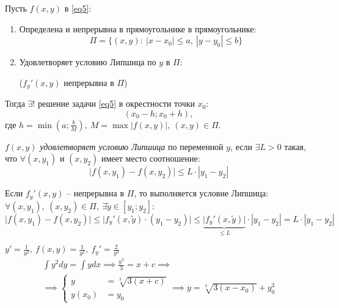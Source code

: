 \begin{theorem}
    Пусть $f(x,y)$ в \ref{eq5}:
    \begin{enumerate}
        \item Определена и непрерывна в прямоугольнике в прямоугольнике:
              \[
                  \Pi = \big\{(x,y): \ |x - x_0| \leqslant a, \ |y - y_0| \leqslant b\big\}
              \]
        \item Удовлетворяет условию Липшица по $y$ в $\Pi$:
              \begin{center}
                  \big($f_y'(x,y)$ непрерывна в $\Pi$\big)
              \end{center}
    \end{enumerate}

    Тогда $\exists !$ решение задачи \ref{eq5} в окрестности точки $x_0$:
    \[
        (x_0 - h; x_0 + h),
    \]
    где $h = \min\left(a;\frac{b}{M}\right), \ M = \max|f(x,y)|, \ (x,y) \in \Pi$.
\end{theorem}

\begin{definition}
    $f(x,y)$ \emph{удовлетворяет условию Липшица} по переменной $y$, если $\exists L > 0$ такая, что $\forall (x,y_1)$ и $(x,y_2)$ имеет место соотношение:
    \[
        \big|f(x,y_1) - f(x,y_2)\big| \leqslant L \cdot|y_1 - y_2|
    \]

    Если $f_y'(x,y)$ -- непрерывна в $\Pi$, то выполняется условие Липшица: $\forall (x,y_1), \ (x,y_2) \in \Pi, \ \exists \widetilde{y} \in [y_1;y_2]$:
    \[
        \big|f(x,y_1) - f(x,y_2)\big| \leqslant \big|f_y'(x,\widetilde{y}) \cdot (y_1 - y_2)\big| \leqslant \underbrace{\big|f_y'(x,\widetilde{y})\big|}_{\leqslant L}\cdot|y_1 - y_2| = L\cdot|y_1 - y_2|
    \]
\end{definition}

\begin{example}
    $y' = \frac{1}{y^2}, \ f(x,y) = \frac{1}{y^2}, \ f_y'=\frac{2}{y^3}$
    \begin{multline*}
        \int y^2dy = \int ydx \implies \frac{y^3}{3} = x + c \implies \\
        \implies \left\{\begin{array}{rl}
            y      & = \sqrt[3]{3(x + c)} \\
            y(x_0) & = y_0
        \end{array}\right. \implies y = \sqrt[3]{3(x-x_0)} + y_0^3
    \end{multline*}
\end{example}

